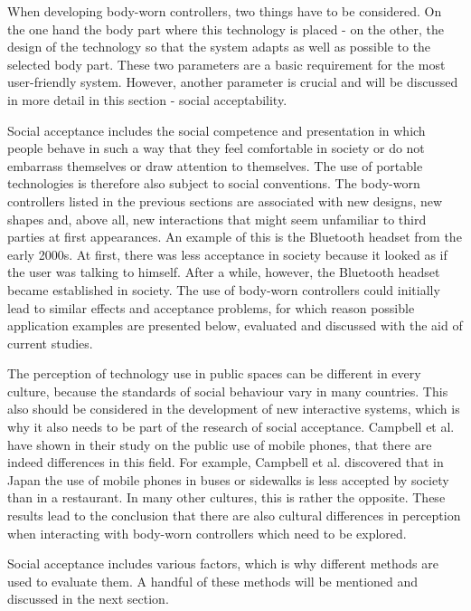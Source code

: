 \documentclass{sigchi}
\begin{document}
When developing body-worn controllers, two things have to be considered. On the one hand the body part where this technology is placed - on the other, the design of the technology so that the system adapts as well as possible to the selected body part. These two parameters are a basic requirement for the most user-friendly system. \cite{touch-wrist} However, another parameter is crucial and will be discussed in more detail in this section - social acceptability.

Social acceptance includes the social competence and presentation in which people behave in such a way that they feel comfortable in society or do not embarrass themselves or draw attention to themselves. \cite{self-everyday} The use of portable technologies is therefore also subject to social conventions. The body-worn controllers listed in the previous sections are associated with new designs, new shapes and, above all, new interactions that might seem unfamiliar to third parties at first appearances.
An example of this is the Bluetooth headset from the early 2000s. At first, there was less acceptance in society because it looked as if the user was talking to himself. After a while, however, the Bluetooth headset became established in society. \cite{usable-gesture} The use of body-worn controllers could initially lead to similar effects and acceptance problems, for which reason possible application examples are presented below, evaluated and discussed with the aid of current studies.

The perception of technology use in public spaces can be different in every culture, because the standards of social behaviour vary in many countries. This also should be considered in the development of new interactive systems, which is why it also needs to be part of the research of social acceptance. Campbell et al. have shown in their study on the public use of mobile phones, that there are indeed differences in this field. For example, Campbell et al. discovered that in Japan the use of mobile phones in buses or sidewalks is less accepted by society than in a restaurant. In many other cultures, this is rather the opposite. \cite{mobile-phones} These results lead to the conclusion that there are also cultural differences in perception when interacting with body-worn controllers which need to be explored.

Social acceptance includes various factors, which is why different methods are used to evaluate them. A handful of these methods will be mentioned and discussed in the next section.
\end{document}
